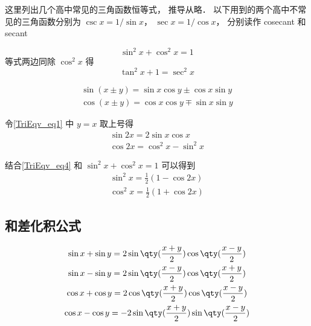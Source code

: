 

这里列出几个高中常见的三角函数恒等式， 推导从略． 以下用到的两个高中不常见的三角函数分别为 $\csc x= 1/\sin x$， $\sec x = 1/\cos x$， 分别读作 cosecant 和 secant\\

\noindent{}

\begin{equation}
\sin^2 x + \cos^2 x = 1
\end{equation}
等式两边同除 $\cos^2 x$ 得
\begin{equation}\label{TriEqv_eq13}
\tan^2 x + 1 = \sec^2 x
\end{equation}

\noindent{}
\begin{gather}\label{TriEqv_eq1}
\sin(x\pm y) = \sin x\cos y \pm \cos x\sin y\\
\cos(x\pm y) = \cos x\cos y \mp \sin x\sin y
\end{gather}

\noindent{}

令\autoref{TriEqv_eq1} 中 $y=x$ 取上号得
\begin{gather}
\sin 2x = 2\sin x\cos x\\
 \cos 2x = \cos^2 x - \sin^2 x \label{TriEqv_eq4}
\end{gather}

\noindent{}

结合\autoref{TriEqv_eq4} 和 $\sin^2 x + \cos^2 x = 1$ 可以得到
\begin{gather}
\sin^2 x = \frac12 (1- \cos 2x) \label{TriEqv_eq5} \\
\cos^2 x = \frac12 (1+\cos 2x) \label{TriEqv_eq6}
\end{gather}

\subsection{和差化积公式}

\begin{gather}
\sin x + \sin y = 2\sin\qty(\frac{x + y}{2})\cos\qty(\frac{x - y}{2})\label{TriEqv_eq7}\\
\sin x - \sin y = 2\sin\qty(\frac{x - y}{2})\cos\qty(\frac{x + y}{2})\label{TriEqv_eq8}\\
\cos x + \cos y = 2\cos\qty(\frac{x+y}{2})\cos\qty(\frac{x-y}{2})\label{TriEqv_eq9}\\
\cos x - \cos y = -2\sin\qty(\frac{x+y}{2})\sin\qty(\frac{x-y}{2})\label{TriEqv_eq10}
\end{gather}

